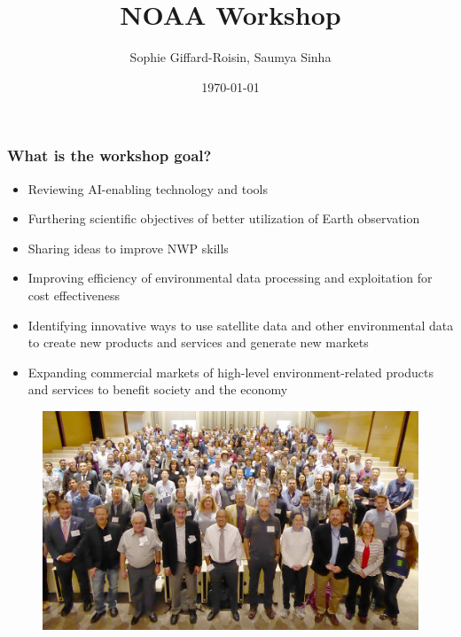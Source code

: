 \documentclass{beamer}
\title[NOAA workshop (Washington DC): Leveraging AI in the expoloitation of Satellite Earth Observations \& numerical weather prediction] %
{NOAA Workshop}
\author{Sophie Giffard-Roisin, Saumya Sinha}
\institute[CU] %
{
	
}
\date{\today} %
\begin{document}
\begin{frame}
\titlepage %
\end{frame}

\begin{frame}
\frametitle{What is the workshop goal?}
\begin{itemize}
\footnotesize
    \item Reviewing AI-enabling technology and tools
    \item Furthering scientific objectives of better utilization of Earth observation
    \item Sharing ideas to improve NWP skills
    \item Improving efficiency of environmental data processing and exploitation for cost effectiveness
    \item Identifying innovative ways to use satellite data and other environmental data to create new products and services and generate new markets
    \item Expanding commercial markets of high-level environment-related products and services to benefit society and the economy

\end{itemize}
\begin{figure}
	\includegraphics[width=0.45\linewidth]{figs/AIWkshp2019_grouppic_1000x582.jpg}
\end{figure}
\end{frame}

\end{document}
